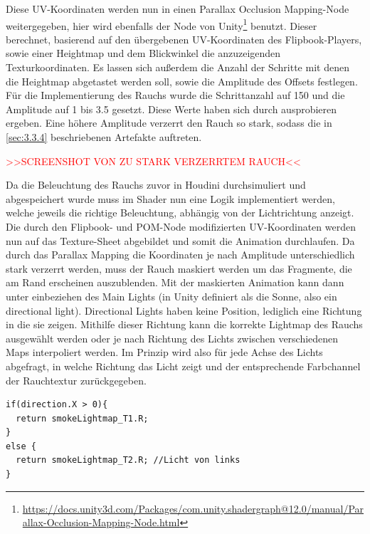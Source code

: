 Diese UV-Koordinaten werden nun in einen Parallax Occlusion Mapping-Node weitergegeben, hier wird ebenfalls der Node von Unity\footnote{\url{https://docs.unity3d.com/Packages/com.unity.shadergraph@12.0/manual/Parallax-Occlusion-Mapping-Node.html}}
benutzt. Dieser berechnet, basierend auf den übergebenen UV-Koordinaten des Flipbook-Players, sowie einer Heightmap und dem Blickwinkel die anzuzeigenden Texturkoordinaten.
Es lassen sich außerdem die Anzahl der Schritte mit denen die Heightmap abgetastet werden soll, sowie die Amplitude des Offsets festlegen.
Für die Implementierung des Rauchs wurde die Schrittanzahl auf 150 und die Amplitude auf 1 bis 3.5 gesetzt. Diese Werte haben sich durch ausprobieren ergeben.
Eine höhere Amplitude verzerrt den Rauch so stark, sodass die in \autoref{sec:3.3.4} beschriebenen Artefakte auftreten.

\textcolor{red}{>>SCREENSHOT VON ZU STARK VERZERRTEM RAUCH<<}

Da die Beleuchtung des Rauchs zuvor in Houdini durchsimuliert und abgespeichert wurde muss im Shader nun eine Logik implementiert werden, welche jeweils die richtige Beleuchtung,
abhängig von der Lichtrichtung anzeigt. Die durch den Flipbook- und POM-Node modifizierten UV-Koordinaten werden nun auf das Texture-Sheet abgebildet und somit die Animation durchlaufen.
Da durch das Parallax Mapping die Koordinaten je nach Amplitude unterschiedlich stark verzerrt werden, muss der Rauch maskiert werden um das Fragmente, die am Rand erscheinen auszublenden.
Mit der maskierten Animation kann dann unter einbeziehen des Main Lights (in Unity definiert als die Sonne, also ein directional light). Directional Lights haben keine Position,
lediglich eine Richtung in die sie zeigen. Mithilfe dieser Richtung kann die korrekte Lightmap des Rauchs ausgewählt werden oder je nach Richtung des Lichts
zwischen verschiedenen Maps interpoliert werden. Im Prinzip wird also für jede Achse des Lichts abgefragt, in welche Richtung das Licht zeigt und der entsprechende Farbchannel
der Rauchtextur zurückgegeben.

\vspace{.6cm}
\begin{lstlisting}[language={[Sharp]C}, label={lst:lightMapLogik}, caption={Logik zur Auswahl der richtigen Lightmap am Beispiel der X-Richtung des Lichts},captionpos=b, frame=single]
if(direction.X > 0){
  return smokeLightmap_T1.R; 
}
else {
  return smokeLightmap_T2.R; //Licht von links
}

\end{lstlisting}


